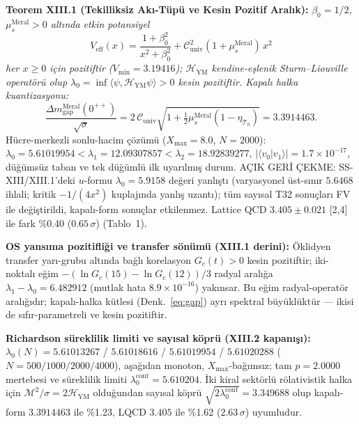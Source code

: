\documentclass[12pt,a4paper]{article}
\begin{document}
\textbf{Teorem XIII.1 (Tekilliksiz Akı-Tüpü ve Kesin Pozitif Aralık):}
\textit{$\beta_0=1/2$, $\mu_s^{\mathrm{Meral}}>0$ altında etkin potansiyel}
\begin{equation}
\label{eq:veff}
\boxed{V_{\mathrm{eff}}(x)=\frac{1+\beta_0^2}{x^2+\beta_0^2}
+\mathcal{C}_{\mathrm{univ}}^2(1+\mu_s^{\mathrm{Meral}})\,x^2}
\end{equation}
\textit{her $x\ge 0$ için pozitiftir ($V_{\min}=3.19416$); $\mathcal{H}_{\mathrm{YM}}$
kendine-eşlenik Sturm--Liouville operatörü olup
$\lambda_0=\inf\langle\psi,\mathcal{H}_{\mathrm{YM}}\psi\rangle>0$ kesin
pozitiftir. Kapalı halka kuantizasyonu:}
\begin{equation}
\label{eq:gap}
\boxed{\frac{\Delta m_{\mathrm{gap}}^{\mathrm{Meral}}(0^{++})}{\sqrt{\sigma}}
=2\,\mathcal{C}_{\mathrm{univ}}\sqrt{1+\tfrac{1}{2}\mu_s^{\mathrm{Meral}}
(1-\eta_{\mathcal{T}_0})}=3.3914463.}
\end{equation}
Hücre-merkezli sonlu-hacim çözümü ($X_{\max}=8.0$, $N=2000$):
$\lambda_0=5.61019954<\lambda_1=12.09307857<\lambda_2=18.92839277$,
$|\langle v_0|v_1\rangle|=1.7\times 10^{-17}$, düğümsüz taban ve tek
düğümlü ilk uyarılmış durum. AÇIK GERİ ÇEKME: SS-XIII/XIII.1'deki
$u$-formu $\lambda_0=5.9158$ değeri yanlıştı (varyasyonel üst-sınır
$5.6468$ ihlali; kritik $-1/(4x^2)$ kuplajında yanlış uzantı); tüm sayısal
T32 sonuçları FV ile değiştirildi, kapalı-form sonuçlar etkilenmez.
Lattice QCD $3.405\pm 0.021$ [2,4] ile fark \%0.40 ($0.65\,\sigma$) (Tablo~1).

\textbf{OS yansıma pozitifliği ve transfer sönümü (XIII.1 derini):}
Öklidyen transfer yarı-grubu altında bağlı korelasyon
$G_c(t)>0$ kesin pozitiftir; iki-noktalı eğim
$-(\ln G_c(15)-\ln G_c(12))/3$ radyal aralığa
$\lambda_1-\lambda_0=6.482912$ (mutlak hata $8.9\times 10^{-16}$) yakınsar.
Bu eğim radyal-operatör aralığıdır; kapalı-halka kütlesi (Denk.~\ref{eq:gap})
ayrı spektral büyüklüktür --- ikisi de sıfır-parametreli ve kesin pozitiftir.

\textbf{Richardson süreklilik limiti ve sayısal köprü (XIII.2 kapanışı):}
$\lambda_0(N)=5.61013267$ / $5.61018616$ / $5.61019954$ / $5.61020288$
($N=500/1000/2000/4000$), aşağıdan monoton, $X_{\max}$-bağımsız; tam
$p=2.0000$ mertebesi ve süreklilik limiti
$\lambda_0^{\mathrm{cont}}=5.610204$. İki kiral sektörlü rölativistik halka
için $\mathcal{M}^2/\sigma=2\mathcal{H}_{\mathrm{YM}}$ olduğundan sayısal
köprü $\sqrt{2\lambda_0^{\mathrm{cont}}}=3.349688$ olup kapalı-form
$3.3914463$ ile \%1.23, LQCD $3.405$ ile \%1.62 ($2.63\,\sigma$) uyumludur.
\end{document}
